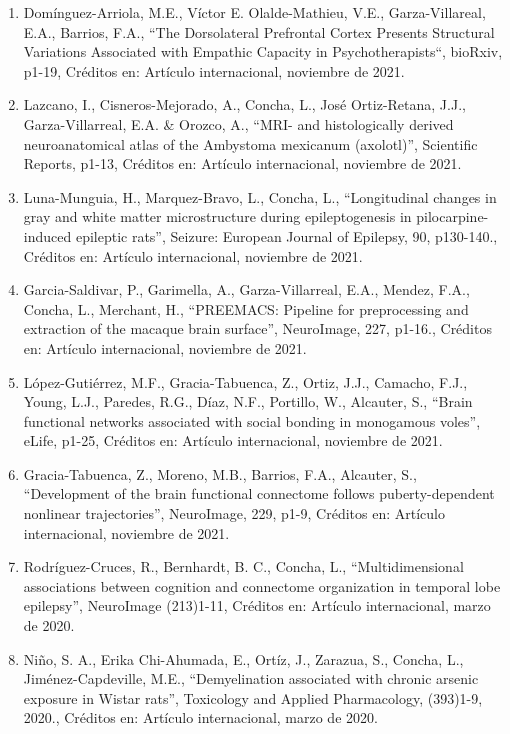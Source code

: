 \begin{enumerate}
\item Domínguez-Arriola, M.E., Víctor E. Olalde-Mathieu, V.E., Garza-Villareal, E.A., Barrios, F.A., “The Dorsolateral 
Prefrontal Cortex Presents Structural Variations Associated with Empathic Capacity in Psychotherapists“, bioRxiv, p1-19, 
Créditos en: Artículo internacional, noviembre de 2021.

\item Lazcano, I., Cisneros-Mejorado, A., Concha, L., José Ortiz-Retana, J.J., Garza-Villarreal, E.A. \& Orozco, A., “MRI- 
and histologically derived neuroanatomical atlas of the Ambystoma mexicanum (axolotl)”, Scientific Reports, p1-13, Créditos 
en: Artículo internacional, noviembre de 2021.

\item Luna-Munguia, H., Marquez-Bravo, L., Concha, L., “Longitudinal changes in gray and white matter microstructure during 
epileptogenesis in pilocarpine-induced epileptic rats”, Seizure: European Journal of Epilepsy, 90, p130-140., Créditos en: 
Artículo internacional, noviembre de 2021.

\item Garcia-Saldivar, P., Garimella, A., Garza-Villarreal, E.A., Mendez, F.A., Concha, L., Merchant, H., “PREEMACS: 
Pipeline 
for preprocessing and extraction of the macaque brain surface”, NeuroImage, 227, p1-16., Créditos en: Artículo 
internacional, noviembre de 2021.

\item López-Gutiérrez, M.F., Gracia-Tabuenca, Z., Ortiz, J.J., Camacho, F.J., Young, L.J., Paredes, R.G., Díaz, N.F., 
Portillo, W., Alcauter, S., “Brain functional networks associated with social bonding in monogamous voles”, eLife, p1-25, 
Créditos en: Artículo internacional, noviembre de 2021.

\item Gracia-Tabuenca, Z., Moreno, M.B., Barrios, F.A., Alcauter, S., “Development of the brain functional connectome 
follows 
puberty-dependent nonlinear trajectories”, NeuroImage, 229, p1-9, Créditos en: Artículo internacional, noviembre de 2021.

\item Rodríguez-Cruces, R., Bernhardt, B. C., Concha, L., “Multidimensional associations between cognition and connectome 
organization in temporal lobe epilepsy”, NeuroImage (213)1-11, Créditos en: Artículo internacional, marzo de 2020.

\item Niño, S. A., Erika Chi-Ahumada, E., Ortíz, J., Zarazua, S., Concha, L., Jiménez-Capdeville, M.E., “Demyelination associated with chronic arsenic exposure in Wistar rats”, Toxicology and Applied 
Pharmacology, (393)1-9, 2020., Créditos en: Artículo internacional, marzo de 2020.


\end{enumerate}
